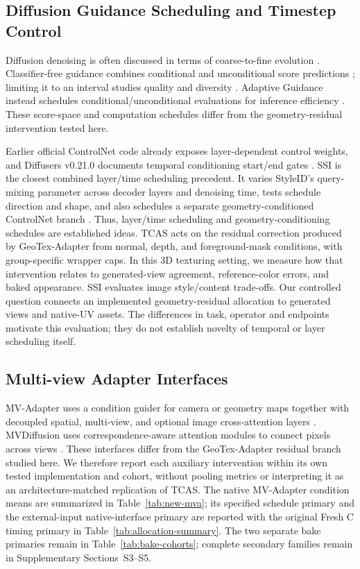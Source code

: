 \documentclass[times,twocolumn,final]{elsarticle}
\begin{document}
\subsection{Diffusion Guidance Scheduling and Timestep Control}
\label{subsec:guidance}

Diffusion denoising is often discussed in terms of coarse-to-fine evolution \cite{ho2020ddpm,song2021ddim}. Classifier-free guidance combines conditional and unconditional score predictions \cite{ho2022cfg}; limiting it to an interval studies quality and diversity \cite{kynkanniemi2024limited}. Adaptive Guidance instead schedules conditional/unconditional evaluations for inference efficiency \cite{castillo2023adaptive}. These score-space and computation schedules differ from the geometry-residual intervention tested here.

Earlier official ControlNet code already exposes layer-dependent control weights, and Diffusers v0.21.0 documents temporal conditioning start/end gates \cite{controlnet2023layercontrol,diffusers2023controlnet}. SSI is the closest combined layer/time scheduling precedent. It varies StyleID's query-mixing parameter \cite{chung2024styleid} across decoder layers and denoising time, tests schedule direction and shape, and also schedules a separate geometry-conditioned ControlNet branch \cite{kulkarni2026ssi}. Thus, layer/time scheduling and geometry-conditioning schedules are established ideas. TCAS acts on the residual correction produced by GeoTex-Adapter from normal, depth, and foreground-mask conditions, with group-specific wrapper caps. In this 3D texturing setting, we measure how that intervention relates to generated-view agreement, reference-color errors, and baked appearance. SSI evaluates image style/content trade-offs. Our controlled question connects an implemented geometry-residual allocation to generated views and native-UV assets. The differences in task, operator and endpoints motivate this evaluation; they do not establish novelty of temporal or layer scheduling itself.

\subsection{Multi-view Adapter Interfaces}
\label{subsec:mvinterfaces}

MV-Adapter uses a condition guider for camera or geometry maps together with decoupled spatial, multi-view, and optional image cross-attention layers \cite{huang2024mvadapter}. MVDiffusion uses correspondence-aware attention modules to connect pixels across views \cite{tang2023mvdiffusion}. These interfaces differ from the GeoTex-Adapter residual branch studied here. We therefore report each auxiliary intervention within its own tested implementation and cohort, without pooling metrics or interpreting it as an architecture-matched replication of TCAS. The native MV-Adapter condition means are summarized in Table~\ref{tab:new-mva}; its specified schedule primary and the external-input native-interface primary are reported with the original Fresh C timing primary in Table~\ref{tab:allocation-summary}. The two separate bake primaries remain in Table~\ref{tab:bake-cohorts}; complete secondary families remain in Supplementary Sections~S3--S5.
\end{document}
